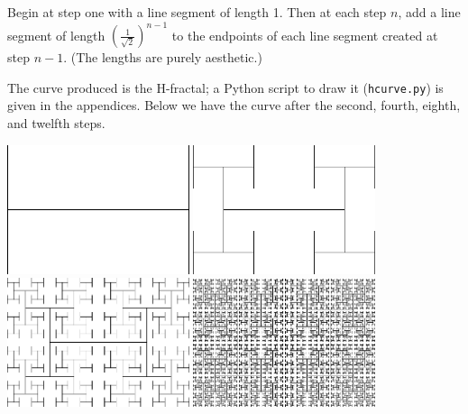 \begin{con}[H-fractal]
  Begin at step one with a line segment of length 1. Then at each step $ n $, add a line segment of length $ \left(\frac{1}{\sqrt{2}}\right)^{n - 1} $ to
  the endpoints of each line segment created at step $ n - 1 $. (The lengths are purely aesthetic.)
\end{con}
The curve produced is the H-fractal; a Python script to draw it (\texttt{hcurve.py}) is given in the appendices. Below we have the curve after
the second, fourth, eighth, and twelfth steps.
\begin{center}
  \includegraphics[width=0.4\textwidth]{hcurve2}\quad
  \includegraphics[width=0.4\textwidth]{hcurve4}\\
  \includegraphics[width=0.4\textwidth]{hcurve8}\quad
  \includegraphics[width=0.4\textwidth]{hcurve12}
\end{center}

